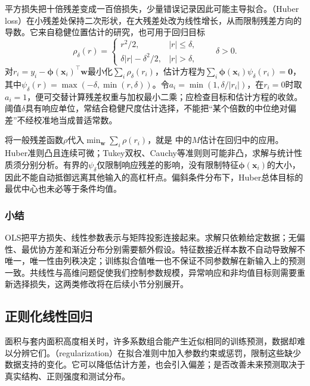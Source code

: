 平方损失把十倍残差变成一百倍损失，少量错误记录因此可能主导拟合。（Huber loss）在小残差处保持二次形状，在大残差处改为线性增长，从而限制残差方向的导数。它来自稳健位置估计的研究，也可用于回归目标
\begin{equation}
  \rho_\delta(r)=
  \begin{cases}
    r^2/2,&|r|\leq\delta,\\
    \delta|r|-\delta^2/2,&|r|>\delta,
  \end{cases}
  \qquad\delta>0.
  \label{eq:regression-huber-loss}
\end{equation}
对$r_i=y_i-\bm{\phi}(\bm{x}_i)^{\top}\bm{w}$最小化$\sum_i\rho_\delta(r_i)$，估计方程为$\sum_i\bm{\phi}(\bm{x}_i)\psi_\delta(r_i)=\bm{0}$，其中$\psi_\delta(r)=\max(-\delta,\min(r,\delta))$。令$a_i=\min(1,\delta/|r_i|)$，在$r_i=0$时取$a_i=1$，便可交替计算残差权重与加权最小二乘；应检查目标和估计方程的收敛。阈值$\delta$具有响应单位，常结合稳健尺度估计选择，不能把“某个倍数的中位绝对偏差”不经校准地当成普适常数。

将一般残差函数$\rho$代入$\min_{\bm{w}}\sum_i\rho(r_i)$，就是
中的\(M\)估计在回归中的应用。Huber准则凸且连续可微；Tukey双权、Cauchy等准则则可能非凸，求解与统计性质须分别分析。有界的$\psi_\delta$仅限制响应残差的影响，没有限制特征$\bm{\phi}(\bm{x}_i)$的大小，因此不能自动抵御远离其他输入的高杠杆点。偏斜条件分布下，Huber总体目标的最优中心也未必等于条件均值。

\subsubsection{小结}

OLS把平方损失、线性参数表示与矩阵投影连接起来。求解只依赖给定数据；无偏性、最优协方差和渐近分布分别需要额外假设。特征数接近样本数不自动导致解不唯一，唯一性由列秩决定；训练拟合值唯一也不保证不同参数解在新输入上的预测一致。共线性与高维问题促使我们控制参数规模，异常响应和非均值目标则需要重新选择损失，这两类修改将在后续小节分别展开。

\subsection{正则化线性回归}
\label{sec:regression-regularization}

面积与套内面积高度相关时，许多系数组合能产生近似相同的训练预测，数据却难以分辨它们。（regularization）在拟合准则中加入参数约束或惩罚，限制这些缺少数据支持的变化。它可以降低估计方差，也会引入偏差；是否改善未来预测取决于真实结构、正则强度和测试分布。

